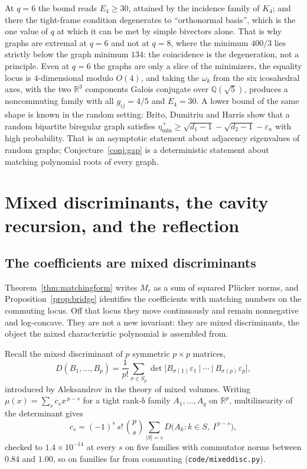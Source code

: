 \documentclass[11pt]{article}
\theoremstyle{remark}
\begin{document}
At $q=6$ the bound reads $E_4\ge30$, attained by the incidence family of $K_4$; and
there the tight-frame condition degenerates to ``orthonormal basis'', which is the
one value of $q$ at which it can be met by simple bivectors alone. That is why
graphs are extremal at $q=6$ and not at $q=8$, where the minimum $400/3$ lies
strictly below the graph minimum $134$: the coincidence is the degeneration, not a
principle. Even at $q=6$ the graphs are only a slice of the minimizers, the
equality locus is $4$-dimensional modulo $O(4)$, and taking the $\omega_k$ from the
six icosahedral axes, with the two $\mathbb R^3$ components Galois conjugate over
$\mathbb Q(\sqrt5)$, produces a noncommuting family with all
$g_{ij}=4/5$ and $E_4=30$. A lower bound of the same shape is known in the random setting: Brito,
Dumitriu and Harris \cite{BDH} show that a random bipartite biregular graph
satisfies $\eta^+_{\min}\ge\sqrt{d_1-1}-\sqrt{d_2-1}-\varepsilon_n$ with high
probability. That is an asymptotic statement about adjacency eigenvalues of
random graphs; Conjecture~\ref{conj:gap} is a deterministic statement about
matching polynomial roots of every graph.



\section{Mixed discriminants, the cavity recursion, and the reflection}

\subsection{The coefficients are mixed discriminants}\label{sec:mixeddisc}

Theorem~\ref{thm:matchingform} writes $M_r$ as a sum of squared Pl\"ucker norms, and
Proposition~\ref{prop:bridge} identifies the coefficients with matching numbers on the commuting
locus. Off that locus they move continuously and remain nonnegative and log-concave. They are not
a new invariant: they are mixed discriminants, the object the mixed characteristic polynomial is
assembled from.

Recall the mixed discriminant of $p$ symmetric $p\times p$ matrices,
\[
D(B_1,\dots,B_p)=\frac1{p!}\sum_{\sigma\in S_p}
\det\bigl[B_{\sigma(1)}\varepsilon_1\ \big|\ \cdots\ \big|\ B_{\sigma(p)}\varepsilon_p\bigr],
\]
introduced by Aleksandrov \cite{Alek} in the theory of mixed volumes. Writing
$\mu(x)=\sum_sc_sx^{\,p-s}$ for a tight rank-$b$ family $A_1,\dots,A_q$ on $\mathbb R^p$,
multilinearity of the determinant gives
\begin{equation}\label{eq:mixeddisc}
c_s=(-1)^s\,s!\,\binom ps\sum_{|S|=s}D\bigl(A_k:k\in S,\ I^{\,p-s}\bigr),
\end{equation}
checked to $1.4\times10^{-14}$ at every $s$ on five families with commutator norms between $0.84$
and $1.00$, so on families far from commuting (\texttt{code/mixeddisc.py}).
\end{document}
